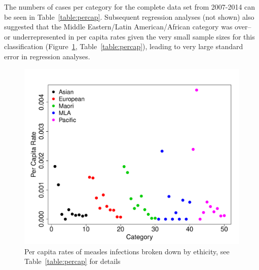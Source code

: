 \documentclass{article}
\begin{document}
The numbers of cases per category for the complete data set from 2007-2014 can be seen in Table~\ref{table:percap}. Subsequent regression analyses (not shown) also suggested that the Middle Eastern/Latin American/African category was over-- or underrepresented in per capita rates given the very small sample sizes for this classification (Figure~\ref{fig:percap}, Table~\ref{table:percap}), leading to very large standard error in regression analyses.

\begin{figure}[h!]
\begin{center}
\includegraphics{interimreport2-010}
\end{center}
\caption{Per capita rates of measles infections broken down by ethicity, see Table~\ref{table:percap} for details}
\label{fig:percap}
\end{figure}
\end{document}
